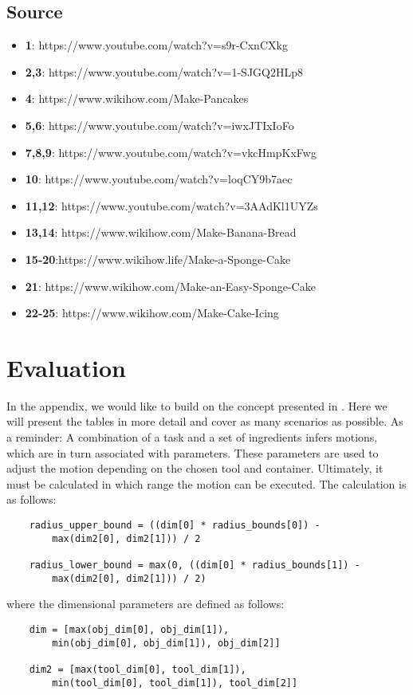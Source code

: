 \subsection*{Source}
\begin{itemize}
    \item \textbf{1}: https://www.youtube.com/watch?v=s9r-CxnCXkg
    \item \textbf{2,3}: https://www.youtube.com/watch?v=1-SJGQ2HLp8
    \item \textbf{4}: https://www.wikihow.com/Make-Pancakes
    \item \textbf{5,6}: https://www.youtube.com/watch?v=iwxJTIxIoFo
    \item \textbf{7,8,9}: https://www.youtube.com/watch?v=vkcHmpKxFwg
    \item \textbf{10}: https://www.youtube.com/watch?v=loqCY9b7aec
    \item \textbf{11,12}: https://www.youtube.com/watch?v=3AAdKl1UYZs
    \item \textbf{13,14}: https://www.wikihow.com/Make-Banana-Bread
    \item \textbf{15-20}:https://www.wikihow.life/Make-a-Sponge-Cake
    \item \textbf{21}: https://www.wikihow.com/Make-an-Easy-Sponge-Cake
    \item \textbf{22-25}: https://www.wikihow.com/Make-Cake-Icing
\end{itemize}
\section{Evaluation}
In the appendix, we would like to build on the concept presented in .
Here we will present the tables in more detail and cover as many scenarios as possible.
As a reminder: A combination of a task and a set of ingredients infers motions, which are in turn associated with parameters.
These parameters are used to adjust the motion depending on the chosen tool and container.
Ultimately, it must be calculated in which range the motion can be executed.
The calculation is as follows:
\begin{lstlisting}
    radius_upper_bound = ((dim[0] * radius_bounds[0]) - 
        max(dim2[0], dim2[1])) / 2

    radius_lower_bound = max(0, ((dim[0] * radius_bounds[1]) - 
        max(dim2[0], dim2[1])) / 2)
\end{lstlisting}
where the dimensional parameters are defined as follows:
\begin{lstlisting}
    dim = [max(obj_dim[0], obj_dim[1]), 
        min(obj_dim[0], obj_dim[1]), obj_dim[2]]

    dim2 = [max(tool_dim[0], tool_dim[1]), 
        min(tool_dim[0], tool_dim[1]), tool_dim[2]]
\end{lstlisting}

